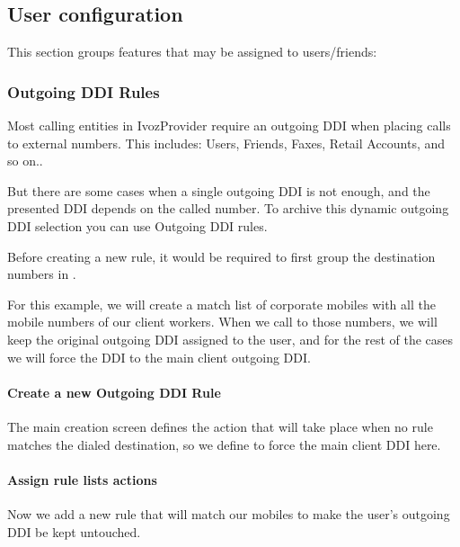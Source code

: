 \documentclass[letterpaper,10pt,english]{sphinxmanual}
\begin{document}
\subsection{User configuration}
\label{administration_portal/client/vpbx/user_configuration/index:user-configuration}\label{administration_portal/client/vpbx/user_configuration/index::doc}
This section groups features that may be assigned to users/friends:


\subsubsection{Outgoing DDI Rules}
\label{administration_portal/client/vpbx/user_configuration/outgoing_ddi_rules:outgoing-ddi-rules}\label{administration_portal/client/vpbx/user_configuration/outgoing_ddi_rules:outgoingddi-rules}\label{administration_portal/client/vpbx/user_configuration/outgoing_ddi_rules::doc}
Most calling entities in IvozProvider require an outgoing DDI when placing calls
to external numbers. This includes: Users, Friends, Faxes, Retail Accounts, and
so on..

But there are some cases when a single outgoing DDI is not enough, and the
presented DDI depends on the called number. To archive this dynamic outgoing DDI
selection you can use Outgoing DDI rules.

Before creating a new rule, it would be required to first group the destination
numbers in {\hyperref[administration_portal/client/vpbx/routing_tools/match_lists:match\string-lists]{}}.

For this example, we will create a match list of corporate mobiles with all
the mobile numbers of our client workers. When we call to those numbers, we
will keep the original outgoing DDI assigned to the user, and for the rest of
the cases we will force the DDI to the main client outgoing DDI.
\paragraph{Create a new Outgoing DDI Rule}

The main creation screen defines the action that will take place when no rule
matches the dialed destination, so we define to force the main client DDI here.
\paragraph{Assign rule lists actions}

Now we add a new rule that will match our mobiles to make the user's outgoing
DDI be kept untouched.
\end{document}
